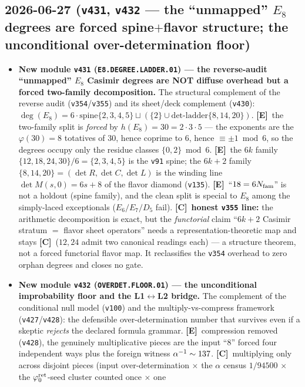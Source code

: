 \documentclass[11pt]{article}
\providecommand{\mE}{\textbf{[E]}}\providecommand{\mC}{\textbf{[C]}}
\providecommand{\vref}[1]{\texttt{#1}}
\begin{document}
\subsection*{2026-06-27 (\texttt{v431}, \texttt{v432} --- the ``unmapped'' $E_8$ degrees are forced spine$+$flavor structure; the unconditional over-determination floor)}
\begin{itemize}
\item \textbf{New module \texttt{v431} (\texttt{E8.DEGREE.LADDER.01}) --- the reverse-audit ``unmapped'' $E_8$
Casimir degrees are NOT diffuse overhead but a forced two-family decomposition.} The structural
complement of the reverse audit (\vref{v354}/\vref{v355}) and its sheet/deck complement (\vref{v430}):
$\deg(E_8)=6\cdot\mathrm{spine}\{2,3,4,5\}\sqcup(\{2\}\cup\mathrm{det\text{-}ladder}\{8,14,20\})$.
\mE\ the two-family split is \emph{forced} by $h(E_8)=30=2\cdot3\cdot5$ --- the exponents are the
$\varphi(30)=8$ totatives of $30$, hence coprime to $6$, hence $\equiv\pm1\bmod6$, so the degrees occupy
only the residue classes $\{0,2\}\bmod6$. \mE\ the $6k$ family $\{12,18,24,30\}/6=\{2,3,4,5\}$ is the
\vref{v91} spine; the $6k{+}2$ family $\{8,14,20\}=(\det R,\det C,\det L)$ is the winding line
$\det M(s,0)=6s+8$ of the flavor diamond (\vref{v135}). \mE\ ``$18=6N_{\mathrm{fam}}$'' is not a holdout (spine
family), and the clean split is special to $E_8$ among the simply-laced exceptionals ($E_6/E_7/D_5$ fail).
\mC\ \textbf{honest \vref{v355} line:} the arithmetic decomposition is exact, but the \emph{functorial}
claim ``$6k{+}2$ Casimir stratum $=$ flavor sheet operators'' needs a representation-theoretic map and
stays \mC\ ($12,24$ admit two canonical readings each) --- a structure theorem, not a forced functorial
flavor map. It reclassifies the \vref{v354} overhead to zero orphan degrees and closes no gate.
\item \textbf{New module \texttt{v432} (\texttt{OVERDET.FLOOR.01}) --- the unconditional improbability
floor and the L1$\leftrightarrow$L2 bridge.} The complement of the conditional null model (\vref{v100})
and the multiply-vs-compress framework (\vref{v427}/\vref{v428}): the defensible over-determination number
that survives even if a skeptic \emph{rejects} the declared formula grammar. \mE\ compression removed
(\vref{v428}), the genuinely multiplicative pieces are the input ``$8$'' forced four independent ways plus
the foreign witness $\alpha^{-1}\sim137$. \mC\ multiplying only across disjoint pieces (input over-determination
$\times$ the $\alpha$ census $1/94500$ $\times$ the $\varphi_0^{\mathrm{ret}}$-seed cluster counted once $\times$ one

\end{itemize}
\end{document}
